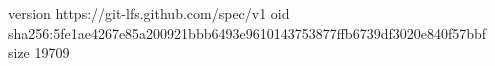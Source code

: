 version https://git-lfs.github.com/spec/v1
oid sha256:5fe1ae4267e85a200921bbb6493e9610143753877ffb6739df3020e840f57bbf
size 19709
